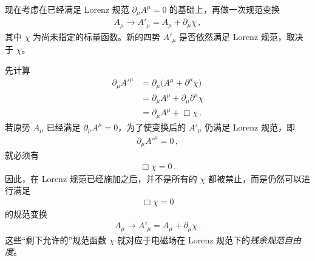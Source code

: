 \begin{derivationnote}
现在考虑在已经满足 Lorenz 规范 $\partial_{\mu}A^{\mu}=0$ 的基础上，再做一次规范变换
\begin{align}
A_{\mu} \longrightarrow A'_{\mu} = A_{\mu} + \partial_{\mu}\chi\,,
\end{align}
其中 $\chi$ 为尚未指定的标量函数。新的四势 $A'_{\mu}$ 是否依然满足 Lorenz 规范，取决于 $\chi$。

先计算
\begin{align}
\partial_{\mu}A'^{\mu}
&=
\partial_{\mu}\big(A^{\mu} + \partial^{\mu}\chi\big)
\\[0.3em]
&=
\partial_{\mu}A^{\mu}
+
\partial_{\mu}\partial^{\mu}\chi
\\[0.3em]
&=
\partial_{\mu}A^{\mu}
+
\Box\chi\,.
\end{align}
若原势 $A_{\mu}$ 已经满足 $\partial_{\mu}A^{\mu}=0$，为了使变换后的 $A'_{\mu}$ 仍满足 Lorenz 规范，即
\begin{align}
\partial_{\mu}A'^{\mu} = 0\,,
\end{align}
就必须有
\begin{align}
\Box\chi = 0\,.
\end{align}
因此，在 Lorenz 规范已经施加之后，并不是所有的 $\chi$ 都被禁止，而是仍然可以进行满足
\begin{align}
\Box\chi = 0
\end{align}
的规范变换
\begin{align}
A_{\mu} \longrightarrow A'_{\mu}
= A_{\mu} + \partial_{\mu}\chi\,.
\end{align}
这些“剩下允许的”规范函数 $\chi$ 就对应于电磁场在 Lorenz 规范下的\emph{残余规范自由度}。
\end{derivationnote}


